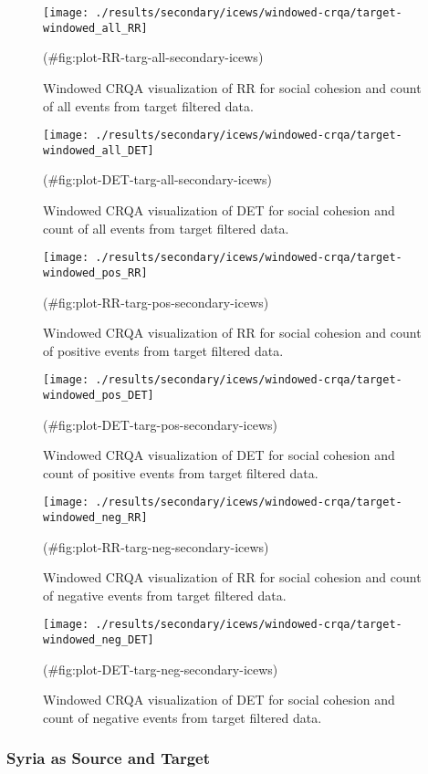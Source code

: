 \begin{appendix}
\begin{figure}
\texttt{[image: ./results/secondary/icews/windowed-crqa/target-windowed\_all\_RR]} \caption{Windowed CRQA visualization of RR for social cohesion and count of all events from target filtered data.}(\#fig:plot-RR-targ-all-secondary-icews)
\end{figure}

\begin{figure}
\texttt{[image: ./results/secondary/icews/windowed-crqa/target-windowed\_all\_DET]} \caption{Windowed CRQA visualization of DET for social cohesion and count of all events from target filtered data.}(\#fig:plot-DET-targ-all-secondary-icews)
\end{figure}

\begin{figure}
\texttt{[image: ./results/secondary/icews/windowed-crqa/target-windowed\_pos\_RR]} \caption{Windowed CRQA visualization of RR for social cohesion and count of positive events from target filtered data.}(\#fig:plot-RR-targ-pos-secondary-icews)
\end{figure}

\begin{figure}
\texttt{[image: ./results/secondary/icews/windowed-crqa/target-windowed\_pos\_DET]} \caption{Windowed CRQA visualization of DET for social cohesion and count of positive events from target filtered data.}(\#fig:plot-DET-targ-pos-secondary-icews)
\end{figure}

\begin{figure}
\texttt{[image: ./results/secondary/icews/windowed-crqa/target-windowed\_neg\_RR]} \caption{Windowed CRQA visualization of RR for social cohesion and count of negative events from target filtered data.}(\#fig:plot-RR-targ-neg-secondary-icews)
\end{figure}

\begin{figure}
\texttt{[image: ./results/secondary/icews/windowed-crqa/target-windowed\_neg\_DET]} \caption{Windowed CRQA visualization of DET for social cohesion and count of negative events from target filtered data.}(\#fig:plot-DET-targ-neg-secondary-icews)
\end{figure}

\hypertarget{syria-as-source-and-target-1}{%
\subsubsection{Syria as Source and
Target}\label{syria-as-source-and-target-1}}


\end{appendix}
